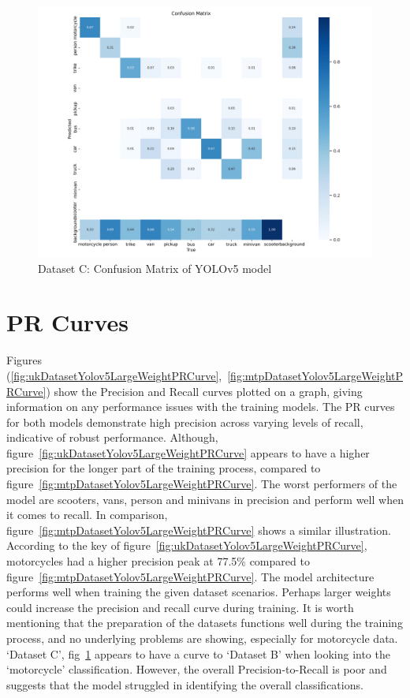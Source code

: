 \documentclass[12pt]{report} %
\begin{document}
		\begin{figure}[hb]
			\centering
			\includegraphics[width=0.95\columnwidth]{Figures/dataset_c/confusion_matrix.png}
			\caption{Dataset C: Confusion Matrix of YOLOv5 model}
			\label{fig:ntDatasetYolov5MediumWeight}
		\end{figure}

	\clearpage
	\section{PR Curves}
		Figures (\ref{fig:ukDatasetYolov5LargeWeightPRCurve},~\ref{fig:mtpDatasetYolov5LargeWeightPRCurve}) show the Precision and Recall curves plotted on a graph, giving information on any performance issues with the training models. The PR curves for both models demonstrate high precision across varying levels of recall, indicative of robust performance. Although, figure~\ref{fig:ukDatasetYolov5LargeWeightPRCurve} appears to have a higher precision for the longer part of the training process, compared to figure~\ref{fig:mtpDatasetYolov5LargeWeightPRCurve}. The worst performers of the model are scooters, vans, person and minivans in precision and perform well when it comes to recall. In comparison, figure~\ref{fig:mtpDatasetYolov5LargeWeightPRCurve} shows a similar illustration. According to the key of figure~\ref{fig:ukDatasetYolov5LargeWeightPRCurve}, motorcycles had a higher precision peak at 77.5\% compared to figure~\ref{fig:mtpDatasetYolov5LargeWeightPRCurve}. The model architecture performs well when training the given dataset scenarios. Perhaps larger weights could increase the precision and recall curve during training. It is worth mentioning that the preparation of the datasets functions well during the training process, and no underlying problems are showing, especially for motorcycle data. `Dataset C', fig~\ref{fig:ntDatasetYolov5MediumWeight} appears to have a curve to `Dataset B' when looking into the `motorcycle' classification. However, the overall Precision-to-Recall is poor and suggests that the model struggled in identifying the overall classifications.
\end{document}

